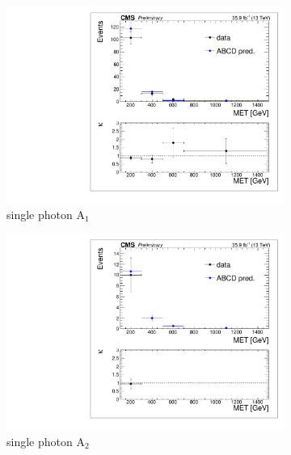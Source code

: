 \begin{figure}[hbp!]
\centering
\begin{subfigure}[b]{0.425\textwidth}
\includegraphics[trim={5px 5px 5px 5px},clip,width=\textwidth]{figs/SUS17006/dataClosure_single-tagSR_photon.pdf}
\caption{single photon A$_{1}$}
\end{subfigure}
\begin{subfigure}[b]{0.425\textwidth}
\includegraphics[trim={5px 5px 5px 5px},clip,width=\textwidth]{figs/SUS17006/dataClosure_double-tagSR_photon.pdf} 
\caption{single photon A$_{2}$}
\end{subfigure}
\vspace{5mm}
\\
\begin{subfigure}[b]{0.425\textwidth}

\end{subfigure}
\end{figure}
